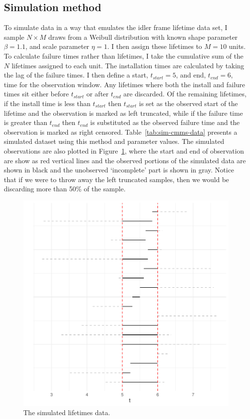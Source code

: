 \subsection{Simulation method}

To simulate data in a way that emulates the idler frame lifetime data set, I sample $N \times M$ draws from a Weibull distribution with known shape parameter $\beta = 1.1$, and scale parameter $\eta = 1$. I then assign these lifetimes to $M = 10$ units. To calculate failure times rather than lifetimes, I take the cumulative sum of the $N$ lifetimes assigned to each unit. The installation times are calculated by taking the lag of the failure times. I then define a start, $t_{start} = 5$, and end, $t_{end} = 6$, time for the observation window. Any lifetimes where both the install and failure times sit either before $t_{start}$ or after $t_{end}$ are discarded. Of the remaining lifetimes, if the install time is less than $t_{start}$ then $t_{start}$ is set as the observed start of the lifetime and the observation is marked as left truncated, while if the failure time is greater than $t_{end}$ then $t_{end}$ is substituted as the observed failure time and the observation is marked as right censored. Table~\ref{tab:sim-cmms-data} presents a simulated dataset using this method and parameter values. The simulated observations are also plotted in Figure~\ref{fig:sim_censored_units}, where the start and end of observation are show as red vertical lines and the observed portions of the simulated data are shown in black and the unobserved `incomplete' part is shown in gray. Notice that if we were to throw away the left truncated samples, then we would be discarding more than 50\% of the sample.

\begin{figure}
    \centering
    \includegraphics[width=1\textwidth]{./figures/ch-2/sim-data.pdf}
    \caption{The simulated lifetimes data.}
    \label{fig:sim_censored_units}
\end{figure}

